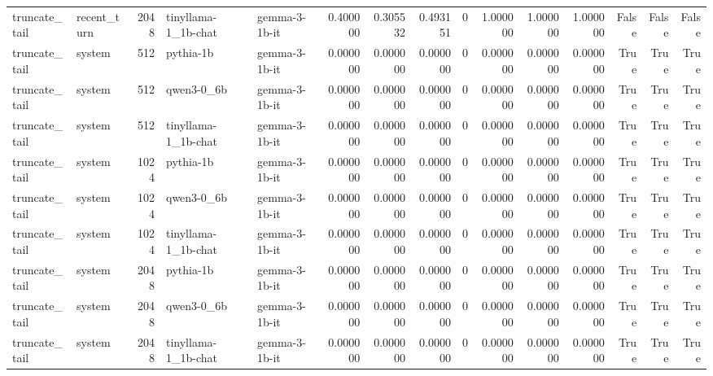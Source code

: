 \begin{tabular}{llrllrrrrrrrrrr}
truncate_tail & recent_turn & 2048 & tinyllama-1_1b-chat & gemma-3-1b-it & 0.400000 & 0.305532 & 0.493151 & 0 & 1.000000 & 1.000000 & 1.000000 & False & False & False \\
truncate_tail & system & 512 & pythia-1b & gemma-3-1b-it & 0.000000 & 0.000000 & 0.000000 & 0 & 0.000000 & 0.000000 & 0.000000 & True & True & True \\
truncate_tail & system & 512 & qwen3-0_6b & gemma-3-1b-it & 0.000000 & 0.000000 & 0.000000 & 0 & 0.000000 & 0.000000 & 0.000000 & True & True & True \\
truncate_tail & system & 512 & tinyllama-1_1b-chat & gemma-3-1b-it & 0.000000 & 0.000000 & 0.000000 & 0 & 0.000000 & 0.000000 & 0.000000 & True & True & True \\
truncate_tail & system & 1024 & pythia-1b & gemma-3-1b-it & 0.000000 & 0.000000 & 0.000000 & 0 & 0.000000 & 0.000000 & 0.000000 & True & True & True \\
truncate_tail & system & 1024 & qwen3-0_6b & gemma-3-1b-it & 0.000000 & 0.000000 & 0.000000 & 0 & 0.000000 & 0.000000 & 0.000000 & True & True & True \\
truncate_tail & system & 1024 & tinyllama-1_1b-chat & gemma-3-1b-it & 0.000000 & 0.000000 & 0.000000 & 0 & 0.000000 & 0.000000 & 0.000000 & True & True & True \\
truncate_tail & system & 2048 & pythia-1b & gemma-3-1b-it & 0.000000 & 0.000000 & 0.000000 & 0 & 0.000000 & 0.000000 & 0.000000 & True & True & True \\
truncate_tail & system & 2048 & qwen3-0_6b & gemma-3-1b-it & 0.000000 & 0.000000 & 0.000000 & 0 & 0.000000 & 0.000000 & 0.000000 & True & True & True \\
truncate_tail & system & 2048 & tinyllama-1_1b-chat & gemma-3-1b-it & 0.000000 & 0.000000 & 0.000000 & 0 & 0.000000 & 0.000000 & 0.000000 & True & True & True \\
\bottomrule
\end{tabular}
